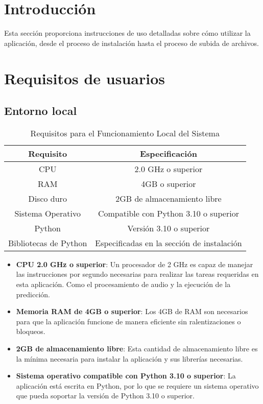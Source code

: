 
\section{Introducción}

Esta sección proporciona instrucciones de uso detalladas sobre cómo utilizar la aplicación, desde el proceso de instalación hasta el proceso de subida de archivos.

\section{Requisitos de usuarios}

\subsection{Entorno local}

\begin{table}[h]
	\centering
	\begin{tabular}{|c|c|}
		\hline
		\textbf{Requisito} & \textbf{Especificación}\\
		\hline
		CPU & 2.0 GHz o superior\\
		\hline
		RAM & 4GB o superior\\
		\hline
		Disco duro & 2GB de almacenamiento libre\\
		\hline
		Sistema Operativo & Compatible con Python 3.10 o superior\\
		\hline
		Python & Versión 3.10 o superior\\
		\hline
		Bibliotecas de Python & Especificadas en la sección de instalación\\
		\hline
	\end{tabular}
	\caption{Requisitos para el Funcionamiento Local del Sistema}
\end{table}

\begin{itemize}
\tightlist

\item \textbf{CPU 2.0 GHz o superior}: Un procesador de 2 GHz es capaz de manejar las instrucciones por segundo necesarias para realizar las tareas requeridas en esta aplicación. Como el procesamiento de audio y la ejecución de la predicción.

\item \textbf{Memoria RAM de 4GB o superior}: Los 4GB de RAM son necesarios para que la aplicación funcione de manera eficiente sin ralentizaciones o bloqueos.

\item \textbf{2GB de almacenamiento libre}: Esta cantidad de almacenamiento libre es la mínima necesaria para instalar la aplicación y sus librerías necesarias.

\item \textbf{Sistema operativo compatible con Python 3.10 o superior}: La aplicación está escrita en Python, por lo que se requiere un sistema operativo que pueda soportar la versión de Python 3.10 o superior.

\end{itemize}

